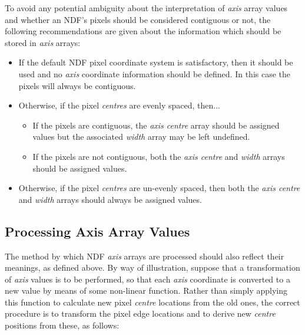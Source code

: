 \documentclass[twoside,11pt,nolof]{starlink}
\providecommand{\st}[1]{{\emph{#1}}}
\begin{document}
To avoid any potential ambiguity about the interpretation of \st{axis\/}
array values and whether an NDF's pixels should be considered contiguous or
not, the following recommendations are given about the information which
should be stored in \st{axis\/} arrays:

\begin{itemize}

\item If the default NDF pixel coordinate system is satisfactory, then it
should be used and no \st{axis\/} coordinate information should be defined.
In this case the pixels will always be contiguous.

\item Otherwise, if the pixel \st{centres\/} are evenly spaced, then...

\begin{itemize}

\item If the pixels are contiguous, the \st{axis centre\/} array should be
assigned values but the associated \st{width\/} array may be left
undefined.

\item If the pixels are not contiguous, both the \st{axis centre} and
\st{width\/} arrays should be assigned values.

\end{itemize}

\item Otherwise, if the pixel \st{centres\/} are un-evenly spaced, then
both the \st{axis centre\/} and \st{width\/} arrays should always be
assigned values.

\end{itemize}

\subsection{Processing Axis Array Values}

The method by which NDF \st{axis\/} arrays are processed should also
reflect their meanings, as defined above.
By way of illustration, suppose that a transformation of \st{axis\/} values
is to be performed, so that each \st{axis\/} coordinate is converted to a
new value by means of some non-linear function.
Rather than simply applying this function to calculate new pixel
\st{centre\/} locations from the old ones, the correct procedure is to
transform
the pixel edge locations and to derive new \st{centre\/} positions from
these, as follows:
\end{document}

